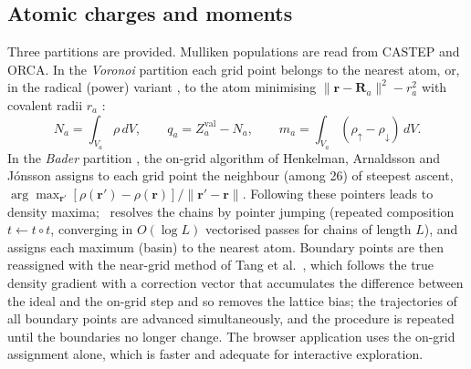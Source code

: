 \subsection{Atomic charges and moments}
Three partitions are provided. Mulliken populations \cite{mulliken1955,segall1996} are read from CASTEP and ORCA. In the \emph{Voronoi} partition \cite{voronoi1908} each grid point belongs to the nearest atom, or, in the radical (power) variant \cite{gellatly1982}, to the atom minimising $\lVert\mathbf r-\mathbf R_a\rVert^2-r_a^2$ with covalent radii $r_a$ \cite{cordero2008}:
\begin{equation}
N_a=\int_{V_a}\rho\,dV,\qquad q_a=Z_a^\mathrm{val}-N_a,\qquad m_a=\int_{V_a}(\rho_\uparrow-\rho_\downarrow)\,dV .
\end{equation}
In the \emph{Bader} partition \cite{bader1990}, the on-grid algorithm of Henkelman, Arnaldsson and Jónsson \cite{henkelman2006} assigns to each grid point the neighbour (among 26) of steepest ascent, $\arg\max_{\mathbf r'}[\rho(\mathbf r')-\rho(\mathbf r)]/\lVert\mathbf r'-\mathbf r\rVert$. Following these pointers leads to density maxima; \BMR\ resolves the chains by pointer jumping (repeated composition $t\leftarrow t\circ t$, converging in $O(\log L)$ vectorised passes for chains of length $L$), and assigns each maximum (basin) to the nearest atom. Boundary points are then reassigned with the near-grid method of Tang et al.\ \cite{tang2009bader}, which follows the true density gradient with a correction vector that accumulates the difference between the ideal and the on-grid step and so removes the lattice bias; the trajectories of all boundary points are advanced simultaneously, and the procedure is repeated until the boundaries no longer change. The browser application uses the on-grid assignment alone, which is faster and adequate for interactive exploration.

